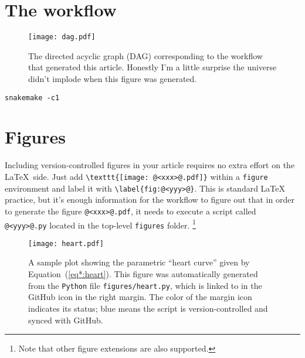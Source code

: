 \documentclass[modern]{aastex62}
\begin{document}
\section{The workflow}

\begin{figure}[t!]
    \begin{centering}
        \texttt{[image: dag.pdf]}
        \caption{
            The directed acyclic graph (DAG) corresponding to the workflow that generated this article. Honestly I'm a little surprise the universe didn't implode when this figure was generated.
        }
        \label{fig:dag}
    \end{centering}
\end{figure}

\begin{lstlisting}[style=bash]
snakemake -c1
\end{lstlisting}

\section{Figures}

Including version-controlled figures in your article requires no extra effort on the \LaTeX\, side.
Just add \lstinline[style=LaTeX]!\texttt{[image: @<xxx>@.pdf]}! within a \lstinline[style=LaTeX]!figure! environment and label it with \lstinline[style=LaTeX]!\label{fig:@<yyy>@}!.
This is standard \LaTeX\, practice, but it's enough information for the workflow to figure out that in order to generate the figure \lstinline[style=LaTeX]!@<xxx>@.pdf!, it needs to execute a script called \lstinline[style=LaTeX]!@<yyy>@.py! located in the top-level \texttt{figures} folder.%
\footnote{Note that other figure extensions are also supported.}

\begin{figure}[t!]
    \begin{centering}
        \texttt{[image: heart.pdf]}
        \caption{
            A sample plot showing the parametric ``heart curve'' given by Equation~(\ref{eq*:heart}).
            This figure was automatically generated from the \texttt{Python} file \texttt{figures/heart.py}, which is linked to in the GitHub icon in the right margin.
            The color of the margin icon indicates its status; blue means the script is version-controlled and synced with GitHub.
        }
        \label{fig:heart}
    \end{centering}
\end{figure}
\end{document}
